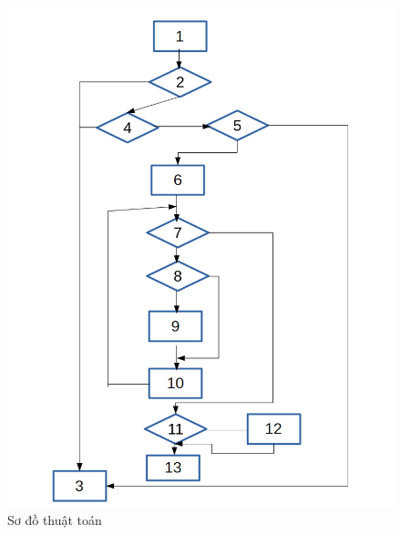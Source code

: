 \documentclass[a4paper,12pt]{report}
\begin{document}
\begin{figure}[H]
\centering
\begin{minipage}[b]{0.45\linewidth}
\includegraphics[scale=0.4]{KTHopTrangSoDo.png}
		\caption{Sơ đồ thuật toán}
\end{minipage}
\quad				
\begin{minipage}[b]{0.45\linewidth}

\end{minipage}
\end{figure}
\end{document}
